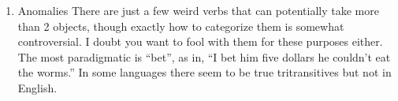 \documentclass{article}
\begin{document}
\begin{enumerate}
\item Anomalies
There are just a few weird verbs that can potentially take more than 2 objects, though exactly how to categorize them is somewhat controversial. I doubt you want to fool with them for these purposes either. The most paradigmatic is ``bet'', as in, ``I bet him five dollars he couldn't eat the worms.'' In some languages there seem to be true tritransitives but not in English.

\end{enumerate}
\end{document}
